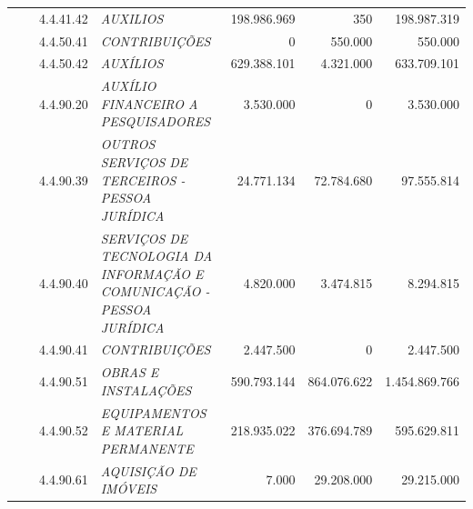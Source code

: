 \documentclass{article}
\begin{document}
\begin{longtable}[c]{m{0.1cm}m{0.1cm}m{0.8cm}|m{8cm}|m{2cm}|m{2cm}|m{2cm}}
\multicolumn{1}{l}{} & \multicolumn{1}{l}{} & \multicolumn{1}{l|}{4.4.41.42} & \multicolumn{1}{L{8cm}|}{\textit{AUXILIOS}} & \multicolumn{1}{r|}{198.986.969} & \multicolumn{1}{r|}{350} &  \multicolumn{1}{r}{198.987.319}\\
\multicolumn{1}{l}{} & \multicolumn{1}{l}{} & \multicolumn{1}{l|}{4.4.50.41} & \multicolumn{1}{L{8cm}|}{\textit{CONTRIBUIÇÕES}} & \multicolumn{1}{r|}{             0} & \multicolumn{1}{r|}{550.000} &  \multicolumn{1}{r}{550.000}\\
\multicolumn{1}{l}{} & \multicolumn{1}{l}{} & \multicolumn{1}{l|}{4.4.50.42} & \multicolumn{1}{L{8cm}|}{\textit{AUXÍLIOS}} & \multicolumn{1}{r|}{629.388.101} & \multicolumn{1}{r|}{4.321.000} &  \multicolumn{1}{r}{633.709.101}\\
\multicolumn{1}{l}{} & \multicolumn{1}{l}{} & \multicolumn{1}{l|}{4.4.90.20} & \multicolumn{1}{L{8cm}|}{\textit{AUXÍLIO FINANCEIRO A PESQUISADORES}} & \multicolumn{1}{r|}{3.530.000} & \multicolumn{1}{r|}{             0} &  \multicolumn{1}{r}{3.530.000}\\
\multicolumn{1}{l}{} & \multicolumn{1}{l}{} & \multicolumn{1}{l|}{4.4.90.39} & \multicolumn{1}{L{8cm}|}{\textit{OUTROS SERVIÇOS DE TERCEIROS - PESSOA JURÍDICA}} & \multicolumn{1}{r|}{24.771.134} & \multicolumn{1}{r|}{72.784.680} &  \multicolumn{1}{r}{97.555.814}\\
\multicolumn{1}{l}{} & \multicolumn{1}{l}{} & \multicolumn{1}{l|}{4.4.90.40} & \multicolumn{1}{L{8cm}|}{\textit{SERVIÇOS DE TECNOLOGIA DA INFORMAÇÃO E COMUNICAÇÃO - PESSOA JURÍDICA}} & \multicolumn{1}{r|}{4.820.000} & \multicolumn{1}{r|}{3.474.815} &  \multicolumn{1}{r}{8.294.815}\\
\multicolumn{1}{l}{} & \multicolumn{1}{l}{} & \multicolumn{1}{l|}{4.4.90.41} & \multicolumn{1}{L{8cm}|}{\textit{CONTRIBUIÇÕES}} & \multicolumn{1}{r|}{2.447.500} & \multicolumn{1}{r|}{             0} &  \multicolumn{1}{r}{2.447.500}\\
\multicolumn{1}{l}{} & \multicolumn{1}{l}{} & \multicolumn{1}{l|}{4.4.90.51} & \multicolumn{1}{L{8cm}|}{\textit{OBRAS E INSTALAÇÕES}} & \multicolumn{1}{r|}{590.793.144} & \multicolumn{1}{r|}{864.076.622} &  \multicolumn{1}{r}{1.454.869.766}\\
\multicolumn{1}{l}{} & \multicolumn{1}{l}{} & \multicolumn{1}{l|}{4.4.90.52} & \multicolumn{1}{L{8cm}|}{\textit{EQUIPAMENTOS E MATERIAL PERMANENTE}} & \multicolumn{1}{r|}{218.935.022} & \multicolumn{1}{r|}{376.694.789} &  \multicolumn{1}{r}{595.629.811}\\
\multicolumn{1}{l}{} & \multicolumn{1}{l}{} & \multicolumn{1}{l|}{4.4.90.61} & \multicolumn{1}{L{8cm}|}{\textit{AQUISIÇÃO DE IMÓVEIS}} & \multicolumn{1}{r|}{7.000} & \multicolumn{1}{r|}{29.208.000} &  \multicolumn{1}{r}{29.215.000}\\

\end{longtable}
\end{document}
